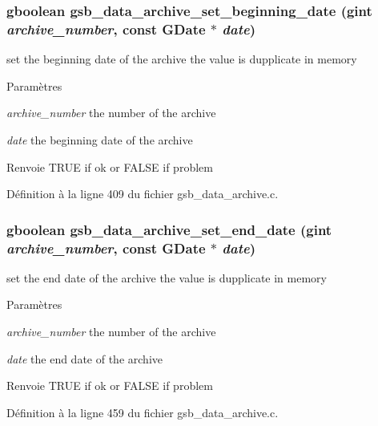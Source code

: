 \subsubsection[{gsb\_\-data\_\-archive\_\-set\_\-beginning\_\-date}]{\setlength{\rightskip}{0pt plus 5cm}gboolean gsb\_\-data\_\-archive\_\-set\_\-beginning\_\-date (gint {\em archive\_\-number}, \/  const GDate $\ast$ {\em date})}\label{gsb__data__archive_8h_ad79c38199834ae790c8534d7addc6b9c}
set the beginning date of the archive the value is dupplicate in memory


\begin{DoxyParams}{Paramètres}
\item[{\em archive\_\-number}]the number of the archive \item[{\em date}]the beginning date of the archive\end{DoxyParams}
\begin{DoxyReturn}{Renvoie}
TRUE if ok or FALSE if problem 
\end{DoxyReturn}


Définition à la ligne 409 du fichier gsb\_\-data\_\-archive.c.

\subsubsection[{gsb\_\-data\_\-archive\_\-set\_\-end\_\-date}]{\setlength{\rightskip}{0pt plus 5cm}gboolean gsb\_\-data\_\-archive\_\-set\_\-end\_\-date (gint {\em archive\_\-number}, \/  const GDate $\ast$ {\em date})}\label{gsb__data__archive_8h_a3a502c684a99f9d9d431c7a7a1ba8ce2}
set the end date of the archive the value is dupplicate in memory


\begin{DoxyParams}{Paramètres}
\item[{\em archive\_\-number}]the number of the archive \item[{\em date}]the end date of the archive\end{DoxyParams}
\begin{DoxyReturn}{Renvoie}
TRUE if ok or FALSE if problem 
\end{DoxyReturn}


Définition à la ligne 459 du fichier gsb\_\-data\_\-archive.c.

